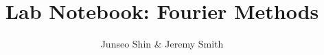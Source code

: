 \documentclass{article}
\author{Junseo Shin \& Jeremy Smith}
\date{}
\title{Lab Notebook: Fourier Methods}
\begin{document}
\maketitle
\tableofcontents
\pagebreak


\newpage


\newpage


\end{document}
